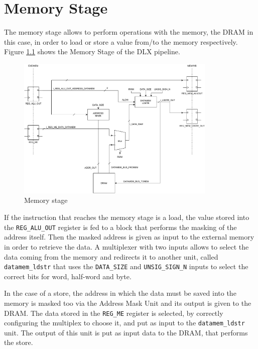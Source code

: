 \chapter{Memory Stage}
\label{chp:memory_stage}
The memory stage allows to perform operations with the memory, the DRAM in this case, in order to load or store a value from/to the memory respectively. Figure \ref{fig:mem_stage} shows the Memory Stage of the DLX pipeline.

\begin{figure}[H]   
    \centering
    \includegraphics[width=0.85\textwidth]{chapters/6_MemoryStage/images/mem_stage.pdf}
    \caption{Memory stage}
    \label{fig:mem_stage}
\end{figure}

If the instruction that reaches the memory stage is a load, the value stored into the \texttt{REG\_ALU\_OUT} register is fed to a block that performs the masking of the address itself. Then the masked address is given as input to the external memory in order to retrieve the data. A multiplexer with two inputs allows to select the data coming from the memory and redirects it to another unit, called \texttt{datamem\_ldstr} that uses the \texttt{DATA\_SIZE} and \texttt{UNSIG\_SIGN\_N} inputs to select the correct bits for word, half-word and byte.

In the case of a store, the address in which the data must be saved into the memory is masked too via the Address Mask Unit and its output is given to the DRAM. The data stored in the \texttt{REG\_ME} register is selected, by correctly configuring the multiplex to choose it, and put as input to the \texttt{datamem\_ldstr} unit. The output of this unit is put as input data to the DRAM, that performs the store.

